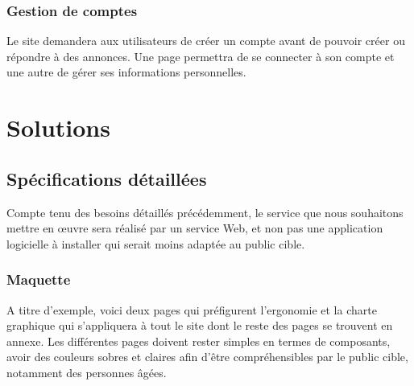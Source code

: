 \documentclass[a4paper,11pt]{article}
\begin{document}
\subsubsection{Gestion de comptes}

Le site demandera aux utilisateurs de créer un compte avant de pouvoir créer ou répondre à des
annonces. Une page permettra de se connecter à son compte et une autre de gérer ses informations
personnelles.\\

\section{Solutions}

\subsection{Spécifications détaillées}

Compte tenu des besoins détaillés précédemment, le service que nous souhaitons mettre en œuvre
sera réalisé par un service Web, et non pas une application logicielle à installer qui serait moins
adaptée au public cible.\\

\subsubsection{Maquette}

A titre d’exemple, voici deux pages qui préfigurent l’ergonomie et la charte graphique qui s’appliquera
à tout le site dont le reste des pages se trouvent en annexe. Les différentes pages doivent rester
simples en termes de composants, avoir des couleurs sobres et claires afin d’être compréhensibles
par le public cible, notamment des personnes âgées.\\
\end{document}
